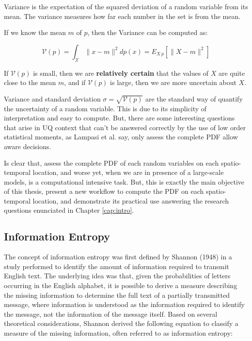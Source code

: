 \begin{defn}
Variance is the expectation of the squared deviation of a random variable from its mean. The variance measures how far each number in the set is from the mean.
\end{defn}

If we know the mean $m$ of $p$, then the Variance can be computed as:

\begin{equation}
\mathcal{V}(\textit{p}) = \int_{\mathcal{X}} \|x-m\|^2dp(x) = E_{X~p}[\|X-m\|^2]
\end{equation}

If $\mathcal{V}(\textit{p})$ is small, then we are \textbf{relatively certain} that the values of $X$ are quite close to the mean $m$, and if $\mathcal{V}(\textit{p})$ is large, then we are more uncertain about $X$.

Variance and standard deviation $\sigma = \sqrt{\mathcal{V}(\textit{p})}$ are the standard way of quantify the uncertainty of a random variable. This is due to its simplicity of interpretation and easy to compute. But, there are some interesting questions that arise in UQ context that can't be answered correctly by the use of low order statistical moments, as Lampasi et al. \cite{Lampasi2006} say, only assess the complete PDF allow aware decisions. 

Is clear that, assess the complete PDF of each random variables on each spatio-temporal location, and worse yet, when we are in presence of a large-scale models, is a computational intensive task. But, this is exactly the main objective of this thesis, present a new workflow to compute the PDF on each spatio-temporal location, and demonstrate its practical use answering the research questions enunciated in Chapter \ref{cap:intro}.

\subsection{Information Entropy}
\label{InformationEntropy}
The concept of information entropy was first defined by Shannon (1948) in a study performed to identify the amount of information required to transmit English text. The underlying idea was that, given the probabilities of letters occurring in the English alphabet, it is possible to derive a measure describing the missing information to determine the full text of a partially transmitted message, where information is understood as the information required to identify the message, not the information of the message itself. Based on several theoretical considerations, Shannon derived the following equation to classify a measure of the missing information, often referred to as information entropy:


